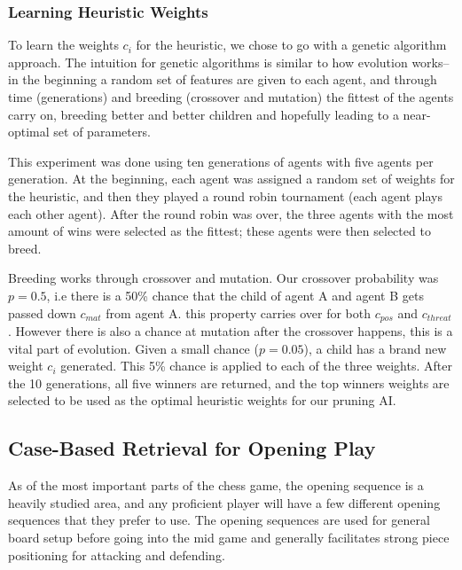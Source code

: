 \documentclass[letterpaper]{article}
\begin{document}
\subsubsection{Learning Heuristic Weights}
To learn the weights $c_i$ for the heuristic, we chose to go with a genetic algorithm approach. The intuition for genetic algorithms is similar to how evolution works--in the beginning a random set of features are given to each agent, and through time (generations) and breeding (crossover and mutation) the fittest of the agents carry on, breeding better and better children and hopefully leading to a near-optimal set of parameters.

This experiment was done using ten generations of agents with five agents per generation. At the beginning, each agent was assigned a random set of weights for the heuristic, and then they played a round robin tournament (each agent plays each other agent). After the round robin was over, the three agents with the most amount of wins were selected as the fittest; these agents were then selected to breed.

Breeding works through crossover and mutation. Our crossover probability was $p=0.5$, i.e there is a 50\% chance that the child of agent A and agent B gets passed down $c_{mat}$ from agent A. this property carries over for both $c_{pos}$ and $c_{threat}$. However there is also a chance at mutation after the crossover happens, this is a vital part of evolution. Given a small chance ($p=0.05$), a child has a brand new weight $c_i$ generated. This 5\% chance is applied to each of the three weights. After the 10 generations, all five winners are returned, and the top winners weights are selected to be used as the optimal heuristic weights for our pruning AI. 

\subsection{Case-Based Retrieval for Opening Play}
As of the most important parts of the chess game, the opening sequence is a heavily studied area, and any proficient player will have a few different opening sequences that they prefer to use. The opening sequences are used for general board setup before going into the mid game and generally facilitates strong piece positioning for attacking and defending.
\end{document}
